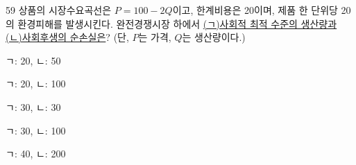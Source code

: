 \begin{question}{59}
상품의 시장수요곡선은 $P=100-2Q$이고, 한계비용은 20이며, 제품 한 단위당 20의 환경피해를 발생시킨다. 완전경쟁시장 하에서 \uline{(ㄱ)사회적 최적 수준의 생산량과 (ㄴ)사회후생의 순손실은}? (단, $P$는 가격, $Q$는 생산량이다.)
\begin{choices}
  \item ㄱ: 20, ㄴ: 50
  \item ㄱ: 20, ㄴ: 100
  \item ㄱ: 30, ㄴ: 30
  \item ㄱ: 30, ㄴ: 100
  \item ㄱ: 40, ㄴ: 200
\end{choices}
\end{question}

